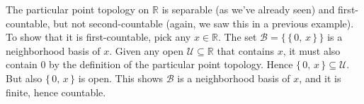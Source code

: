 \documentclass{article}
\theoremstyle{plain}
\theoremstyle{normal}
\newenvironment{example}{%
    \pushQED{\qed}\renewcommand{\qedsymbol}{$\blacksquare$}\examplex%
}{%
    \popQED\endexamplex%
}
\begin{document}
        \begin{example}
            The particular point topology on $\mathbb{R}$ is separable
            (as we've already seen) and first-countable, but not
            second-countable (again, we saw this in a previous example). To
            show that it is first-countable, pick any $x\in\mathbb{R}$. The
            set $\mathcal{B}=\big\{\,\{\,0,\,x\,\}\,\big\}$ is a neighborhood
            basis of $x$. Given any open $\mathcal{U}\subseteq\mathbb{R}$ that
            contains $x$, it must also contain $0$ by the definition of the
            particular point topology. Hence
            $\{\,0,\,x\,\}\subseteq\mathcal{U}$. But also
            $\{\,0,\,x\,\}$ is open. This shows $\mathcal{B}$ is a
            neighborhood basis of $x$, and it is finite, hence countable.
        \end{example}
\end{document}
